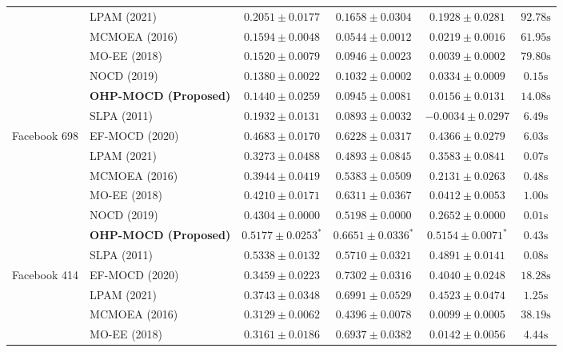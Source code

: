 \documentclass{llncs}
\begin{document}
\begin{table}[t]
{\begin{tabular}{@{}llcccc@{}}
 & LPAM (2021) & $\mathbf{0.2051 \pm 0.0177}$ & $\mathbf{0.1658 \pm 0.0304}$ & $\mathbf{0.1928 \pm 0.0281}$ & $92.78\text{s}$ \\
 & MCMOEA (2016) & $0.1594 \pm 0.0048$ & $0.0544 \pm 0.0012$ & $0.0219 \pm 0.0016$ & $61.95\text{s}$ \\
 & MO-EE (2018) & $0.1520 \pm 0.0079$ & $0.0946 \pm 0.0023$ & $0.0039 \pm 0.0002$ & $79.80\text{s}$ \\
 & NOCD (2019) & $0.1380 \pm 0.0022$ & $0.1032 \pm 0.0002$ & $0.0334 \pm 0.0009$ & $0.15\text{s}$ \\
 & \textbf{OHP-MOCD (Proposed)} & $0.1440 \pm 0.0259$ & $0.0945 \pm 0.0081$ & $0.0156 \pm 0.0131$ & $14.08\text{s}$ \\
 & SLPA (2011) & $0.1932 \pm 0.0131$ & $0.0893 \pm 0.0032$ & $-0.0034 \pm 0.0297$ & $6.49\text{s}$ \\
\midrule
Facebook 698 & EF-MOCD (2020) & $0.4683 \pm 0.0170$ & $0.6228 \pm 0.0317$ & $0.4366 \pm 0.0279$ & $6.03\text{s}$ \\
 & LPAM (2021) & $0.3273 \pm 0.0488$ & $0.4893 \pm 0.0845$ & $0.3583 \pm 0.0841$ & $0.07\text{s}$ \\
 & MCMOEA (2016) & $0.3944 \pm 0.0419$ & $0.5383 \pm 0.0509$ & $0.2131 \pm 0.0263$ & $0.48\text{s}$ \\
 & MO-EE (2018) & $0.4210 \pm 0.0171$ & $0.6311 \pm 0.0367$ & $0.0412 \pm 0.0053$ & $1.00\text{s}$ \\
 & NOCD (2019) & $0.4304 \pm 0.0000$ & $0.5198 \pm 0.0000$ & $0.2652 \pm 0.0000$ & $0.01\text{s}$ \\
 & \textbf{OHP-MOCD (Proposed)} & $0.5177 \pm 0.0253^*$ & $\mathbf{0.6651 \pm 0.0336^*}$ & $\mathbf{0.5154 \pm 0.0071^*}$ & $0.43\text{s}$ \\
 & SLPA (2011) & $\mathbf{0.5338 \pm 0.0132}$ & $0.5710 \pm 0.0321$ & $0.4891 \pm 0.0141$ & $0.08\text{s}$ \\
\midrule
Facebook 414 & EF-MOCD (2020) & $0.3459 \pm 0.0223$ & $0.7302 \pm 0.0316$ & $0.4040 \pm 0.0248$ & $18.28\text{s}$ \\
 & LPAM (2021) & $0.3743 \pm 0.0348$ & $0.6991 \pm 0.0529$ & $0.4523 \pm 0.0474$ & $1.25\text{s}$ \\
 & MCMOEA (2016) & $0.3129 \pm 0.0062$ & $0.4396 \pm 0.0078$ & $0.0099 \pm 0.0005$ & $38.19\text{s}$ \\
 & MO-EE (2018) & $0.3161 \pm 0.0186$ & $0.6937 \pm 0.0382$ & $0.0142 \pm 0.0056$ & $4.44\text{s}$ \\

\end{tabular}}
\end{table}
\end{document}

